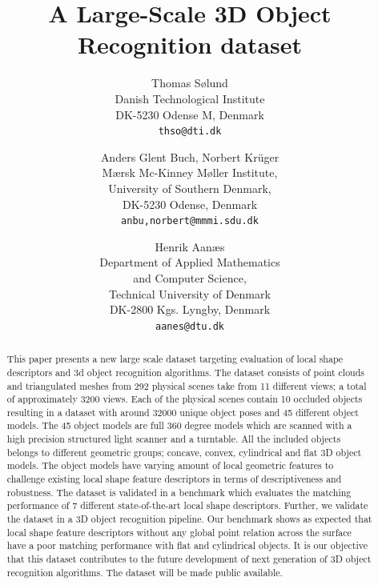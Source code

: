 \documentclass[10pt,twocolumn,letterpaper]{article}
\begin{document}
\title{A Large-Scale 3D Object Recognition dataset}

\author{Thomas S{\o}lund\\
Danish Technological Institute\\
DK-5230 Odense M, Denmark\\
{\tt\small thso@dti.dk}
\and
Anders Glent Buch, Norbert Kr\"u{}ger\\
M\ae{}rsk Mc-Kinney M\o{}ller Institute,\\
University of Southern Denmark,\\
DK-5230 Odense, Denmark \\
{\tt\small anbu,norbert@mmmi.sdu.dk}
\and
Henrik Aan\ae s\\ %
Department of Applied Mathematics\\ and Computer Science,\\ 
Technical University of Denmark\\
DK-2800 Kgs. Lyngby, Denmark\\
{\tt\small aanes@dtu.dk} %
}

\maketitle

\begin{abstract}
This paper presents a new large scale dataset targeting evaluation of local shape descriptors and 3d object recognition algorithms. The dataset consists of point clouds and triangulated meshes from 292 physical scenes take from 11 different views; a total of approximately 3200 views. Each of the physical scenes contain 10 occluded objects resulting in a dataset with around 32000 unique object poses and 45 different object models. The 45 object models are full 360 degree models which are scanned with a high precision structured light scanner and a turntable. All the included objects belongs to different geometric groups; concave, convex, cylindrical and flat 3D object models. The object models have varying amount of local geometric features to challenge existing local shape feature descriptors in terms of descriptiveness and robustness.  The dataset is validated in a benchmark which evaluates the matching performance of 7 different state-of-the-art local shape descriptors. Further, we validate the dataset in a 3D object recognition pipeline. Our benchmark shows as expected that local shape feature descriptors without any global point relation across the surface have a poor matching performance with flat and cylindrical objects. It is our objective that this dataset contributes to the future development of next generation of 3D object recognition algorithms. The dataset will be made public available.
\end{abstract}
\end{document}
